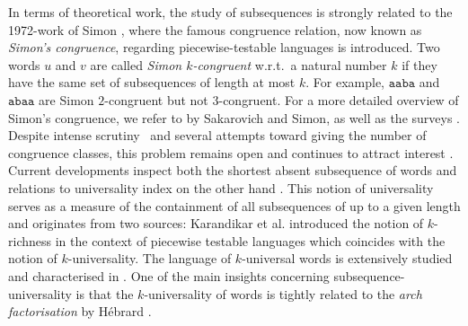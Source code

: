 \documentclass[10pt,a4paper]{amsart}
\newcommand{\N}{\mathbb{N}}
\DeclareMathOperator\ScatFact{SubSeq}
\theoremstyle{plain}
\theoremstyle{definition}
\begin{document}
In terms of theoretical work, the study of subsequences is strongly related to the 1972-work of Simon \cite{simon1972hierarchies}, where the famous congruence relation, now known as \emph{Simon's congruence}, regarding piecewise-testable languages is introduced. Two words $u$ and $v$ are called \emph{Simon $k$-congruent} w.r.t.~a natural number $k$ if they have the same set of subsequences of length at most $k$. For example, $\mathtt{aaba}$ and $\mathtt{abaa}$ are Simon $2$-congruent but not $3$-congruent.
For a more detailed overview of Simon's congruence, we refer to \cite[Chapter 6]{lothaire} by Sakarovich and Simon, as well as the surveys \cite{pin2019influence,Kosche2022SubsequenceSurvey}. Despite intense scrutiny~\cite{DBLP:conf/mfcs/FleischerK18,DBLP:conf/stacs/GawrychowskiKKM21} and several attempts toward giving the number of congruence classes,  this problem remains open and continues to attract interest \cite{DBLP:conf/fct/FleischmannHHN23,DBLP:conf/rp/FleischmannKKMNSW23,DBLP:journals/tcs/KimHKS23,DBLP:conf/dlt/KimHKS23,DBLP:journals/tcs/KimKH24}. Current developments inspect both the shortest absent subsequence of words \cite{DBLP:journals/fuin/KoscheKMS22} and relations to universality index on the other hand \cite{DBLP:conf/dlt/BarkerFHMN20,DBLP:conf/stacs/DayFKKMS21}. This notion of universality serves as a measure of the containment of all subsequences of up to a given length and originates from two sources: Karandikar et al. \cite{DBLP:journals/ipl/KarandikarKS15} introduced the notion of $k$-richness in the context of piecewise testable languages \cite{katai2012word,pach2018normal} 
which coincides with the notion of $k$-universality. The language of $k$-universal words is extensively studied and characterised in \cite{DBLP:conf/isaac/AdamsonFHKMN23,DBLP:conf/dlt/BarkerFHMN20,DBLP:conf/stacs/DayFKKMS21,DBLP:journals/tcs/Hebrard91}. 
One of the main insights concerning subsequence-universality is that the $k$-universality of words is tightly related to the {\em arch factorisation} by Hébrard   \cite{DBLP:journals/tcs/Hebrard91}.
\end{document}
